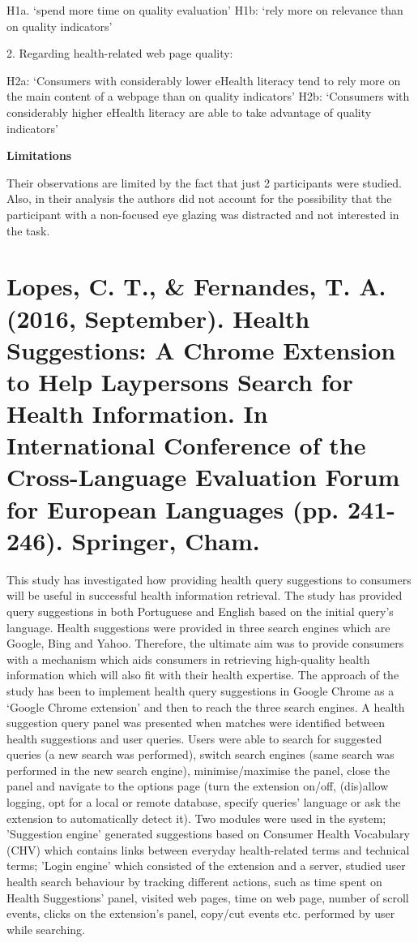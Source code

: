 \documentclass[]{article}
\begin{document}
H1a. ‘spend more time on quality evaluation’
H1b: ‘rely more on relevance than on quality indicators’  

2. Regarding health-related web page quality:

H2a: ‘Consumers with considerably lower eHealth literacy tend to rely more on the main content of a webpage than on quality indicators’
H2b: ‘Consumers with considerably higher eHealth literacy are able to take advantage of quality indicators’ 

\textbf{Limitations}

Their observations are limited by the fact that just 2 participants were studied. Also, in their analysis the authors did not account for the possibility that the participant with a non-focused eye glazing was distracted and not interested in the task.

\section{Lopes, C. T., \& Fernandes, T. A. (2016, September). Health Suggestions: A Chrome Extension to Help Laypersons Search for Health Information. In International Conference of the Cross-Language Evaluation Forum for European Languages (pp. 241-246). Springer, Cham.}

This study has investigated how providing health query suggestions to consumers will be useful in successful health information retrieval. The study has provided query suggestions in both Portuguese and English based on the initial query's language. Health suggestions were provided in three search engines which are Google, Bing and Yahoo. Therefore, the ultimate aim was to provide consumers with a mechanism which aids consumers in retrieving high-quality health information which will also fit with their health expertise. The approach of the study has been to implement health query suggestions in Google Chrome as a ‘Google Chrome extension’ and then to reach the three search engines. A health suggestion query panel was presented when matches were identified between health suggestions and user queries. Users were able to search for suggested queries (a new search was performed), switch search engines (same search was performed in the new search engine), minimise/maximise the panel, close the panel and navigate to the options page (turn the extension on/off, (dis)allow logging, opt for a local or remote database, specify queries’ language or ask the extension to automatically detect it). Two modules were used in the system; 'Suggestion engine' generated suggestions based on Consumer Health Vocabulary (CHV) which contains links between everyday health-related terms and technical terms; 'Login engine' which consisted of the extension and a server, studied user health search behaviour by tracking different actions, such as time spent on Health Suggestions’ panel, visited web pages, time on web page, number of scroll events, clicks on the extension’s panel, copy/cut events etc. performed by user while searching. 
\end{document}
